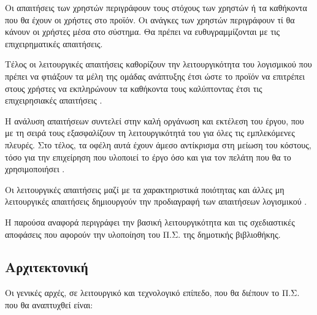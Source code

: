 \documentclass{assignment}
\begin{document}
Οι απαιτήσεις των χρηστών περιγράφουν τους στόχους των χρηστών ή τα καθήκοντα που θα έχουν οι χρήστες στο προϊόν. Οι ανάγκες των χρηστών περιγράφουν τί θα κάνουν οι χρήστες μέσα στο σύστημα. Θα πρέπει να ευθυγραμμίζονται με τις επιχειρηματικές απαιτήσεις. \cite{triadis}

Τέλος οι λειτουργικές απαιτήσεις καθορίζουν την λειτουργικότητα του λογισμικού που πρέπει να φτιάξουν τα μέλη της ομάδας ανάπτυξης έτσι ώστε το προϊόν να επιτρέπει στους χρήστες να εκπληρώνουν τα καθήκοντα τους καλύπτοντας έτσι τις επιχειρησιακές απαιτήσεις \cite{triadis}.

Η ανάλυση απαιτήσεων συντελεί στην καλή οργάνωση και εκτέλεση του έργου, που με τη σειρά τους εξασφαλίζουν τη λειτουργικότητά του για όλες τις εμπλεκόμενες πλευρές. Στο τέλος, τα οφέλη αυτά έχουν άμεσο αντίκρισμα στη μείωση του κόστους, τόσο για την επιχείρηση που υλοποιεί το έργο όσο και για τον πελάτη που θα το χρησιμοποιήσει \cite{kepa:requirement_analysis}.

Οι λειτουργικές απαιτήσεις μαζί με τα χαρακτηριστικά ποιότητας και άλλες μη λειτουργικές απαιτήσεις δημιουργούν την προδιαγραφή των απαιτήσεων λογισμικού \cite{triadis}. 

Η παρούσα αναφορά περιγράφει την βασική λειτουργικότητα και τις σχεδιαστικές αποφάσεις που αφορούν την υλοποίηση του Π.Σ. της δημοτικής βιβλιοθήκης.

\subsection{Αρχιτεκτονική}

Οι γενικές αρχές, σε λειτουργικό και τεχνολογικό επίπεδο, που θα διέπουν το Π.Σ. που θα αναπτυχθεί είναι:
\end{document}
